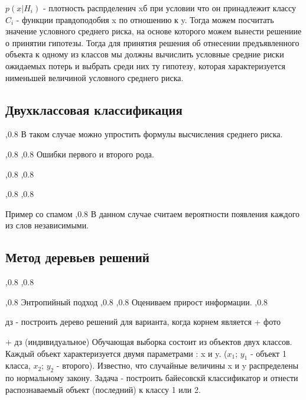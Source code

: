 \documentclass[a4paper,12pt]{report}
\begin{document}
		$p(x|H_i)$ - плотность распрделенич xб при условии что он принадлежит классу $C_i$ - функции правдоподобия x по отношению к y.
		Тогда можем посчитать значение условного среднего риска, на основе которого можем вынести решениие о принятии гипотезы. Тогда для принятия решения об отнесении предъявленного объекта к одному из классов мы должны вычислить условные средние риски ожидаемых потерь и выбрать среди них ту гипотезу, которая характеризуется нименьшей величиной условного среднего риска.

	\subsection{Двухклассовая классификация}
		,0.8
		В таком случае можно упростить формулы высчисления среднего риска.

		,0.8
		,0.8
		Ошибки первого и второго рода.

		,0.8
		,0.8

		,0.8
		,0.8 %

		Пример со спамом
		,0.8
		В данном случае считаем вероятности появления каждого из слов независимыми.

	\subsection{Метод деревьев решений}
		,0.8
		,0.8

		,0.8 %
		Энтропийный подход
		,0.8
		,0.8
		Оцениваем прирост информации.
		,0.8

		дз - построить дерево решений для варианта, когда корнем является + фото

		+ дз (индивидуальное)
		Обучающая выборка состоит из объектов двух классов. Каждый объект характеризуется двумя параметрами : x и y. ($x_1$; $y_1$ - объект 1 класса, $x_2$; $y_2$ - второго). Известно, что случайные величины x и y распределены по нормальному закону. Задача - построить байесовскй классификатор и отнести распознаваемый объект (последний) к классу 1 или 2.
\end{document}
